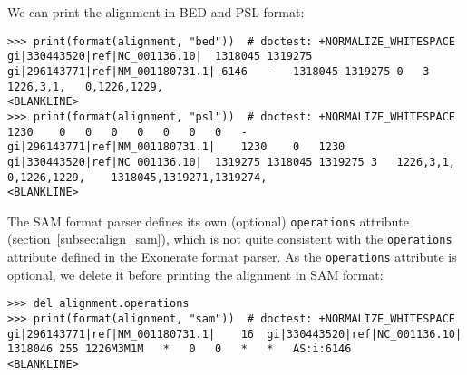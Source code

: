 We can print the alignment in BED and PSL format:
\begin{verbatim}
>>> print(format(alignment, "bed"))  # doctest: +NORMALIZE_WHITESPACE
gi|330443520|ref|NC_001136.10|	1318045	1319275	gi|296143771|ref|NM_001180731.1| 6146	-	1318045	1319275	0	3	1226,3,1,	0,1226,1229,
<BLANKLINE>
>>> print(format(alignment, "psl"))  # doctest: +NORMALIZE_WHITESPACE
1230	0	0	0	0	0	0	0	-	gi|296143771|ref|NM_001180731.1|	1230	0	1230	gi|330443520|ref|NC_001136.10|	1319275	1318045	1319275	3	1226,3,1,	0,1226,1229,	1318045,1319271,1319274,
<BLANKLINE>
\end{verbatim}
The SAM format parser defines its own (optional) \verb|operations| attribute (section~\ref{subsec:align_sam}), which is not quite consistent with the \verb|operations| attribute defined in the Exonerate format parser. As the \verb|operations| attribute is optional, we delete it before printing the alignment in SAM format:
\begin{verbatim}
>>> del alignment.operations
>>> print(format(alignment, "sam"))  # doctest: +NORMALIZE_WHITESPACE
gi|296143771|ref|NM_001180731.1|	16	gi|330443520|ref|NC_001136.10|	1318046	255	1226M3M1M	*	0	0	*	*	AS:i:6146
<BLANKLINE>
\end{verbatim}

